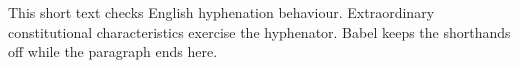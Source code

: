 \documentclass{article}
\begin{document}
This short text checks English hyphenation behaviour.
Extraordinary constitutional characteristics exercise the hyphenator.
Babel keeps the shorthands off while the paragraph ends here.
\end{document}
